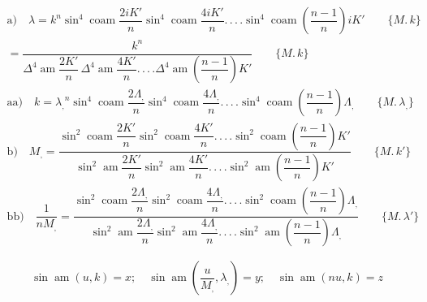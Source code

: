 \documentclass{article}
\begin{document}
\[
\begin{gathered}
\text{a)}\quad \lambda=k^{n}\sin^{4}\operatorname{coam}\dfrac{2iK'}{n}\sin^{4}\operatorname{coam}\dfrac{4iK'}{n}.\,.\,.\,.\sin^{4}\operatorname{coam}\left(\dfrac{n-1}{n}\right)iK'\qquad\{M.\,k\}\\[1.5ex]
{}=\dfrac{k^{n}}{\Delta^{4}\operatorname{am}\dfrac{2K'}{n}\,\Delta^{4}\operatorname{am}\dfrac{4K'}{n}.\,.\,.\,.\Delta^{4}\operatorname{am}\left(\dfrac{n-1}{n}\right)K'}\qquad\{M.\,k\}\\[1.5ex]
\text{aa)}\quad k={\lambda_{,}}^{n}\sin^{4}\operatorname{coam}\dfrac{2\Lambda_{,}}{n}\sin^{4}\operatorname{coam}\dfrac{4\Lambda_{,}}{n}.\,.\,.\,.\sin^{4}\operatorname{coam}\left(\dfrac{n-1}{n}\right)\Lambda_{,}\qquad\{M.\,\lambda_{,}\}\\[1.5ex]
\text{b)}\quad M_{,}=\dfrac{\sin^{2}\operatorname{coam}\dfrac{2K'}{n}\sin^{2}\operatorname{coam}\dfrac{4K'}{n}.\,.\,.\,.\sin^{2}\operatorname{coam}\left(\dfrac{n-1}{n}\right)K'}{\sin^{2}\operatorname{am}\dfrac{2K'}{n}\sin^{2}\operatorname{am}\dfrac{4K'}{n}.\,.\,.\,.\sin^{2}\operatorname{am}\left(\dfrac{n-1}{n}\right)K'}\qquad\{M.\,k'\}\\[1.5ex]
\text{bb)}\quad \dfrac{1}{nM_{,}}=\dfrac{\sin^{2}\operatorname{coam}\dfrac{2\Lambda_{,}}{n}\sin^{2}\operatorname{coam}\dfrac{4\Lambda_{,}}{n}.\,.\,.\,.\sin^{2}\operatorname{coam}\left(\dfrac{n-1}{n}\right)\Lambda_{,}}{\sin^{2}\operatorname{am}\dfrac{2\Lambda_{,}}{n}\sin^{2}\operatorname{am}\dfrac{4\Lambda_{,}}{n}.\,.\,.\,.\sin^{2}\operatorname{am}\left(\dfrac{n-1}{n}\right)\Lambda_{,}}\qquad\{M.\,\lambda'\}
\end{gathered}
\]

\[
\sin\operatorname{am}(u,k)=x;\quad \sin\operatorname{am}\left(\dfrac{u}{M_{,}},\lambda_{,}\right)=y;\quad \sin\operatorname{am}(nu,k)=z
\]
\end{document}
